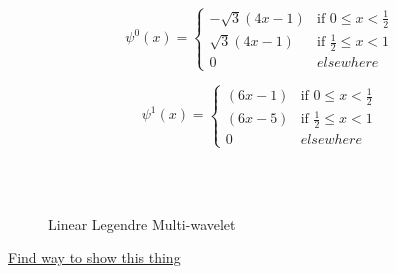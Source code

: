 \begin{equation}
\psi^0(x)=
\left\{
    \begin{array}{ll}
        -\sqrt{3}(4x-1)  & \mbox{if } 0 \leq x < \frac{1}{2} \\
        \sqrt{3}(4x-1)  & \mbox{if } \frac{1}{2} \leq x < 1 \\
        0 & elsewhere
    \end{array}
\right.
\end{equation}

\begin{equation}
\psi^1(x)=
\left\{
    \begin{array}{ll}
        (6x-1)  & \mbox{if } 0 \leq x < \frac{1}{2} \\
        (6x-5)  & \mbox{if } \frac{1}{2} \leq x < 1 \\
        0 & elsewhere
    \end{array}
\right.
\end{equation}

\begin{figure*}
\centering
{}\\
\\
\caption{Linear Legendre Multi-wavelet}
\label{fig:llmwphipsi}
\end{figure*}
\underline{Find way to show this thing}

